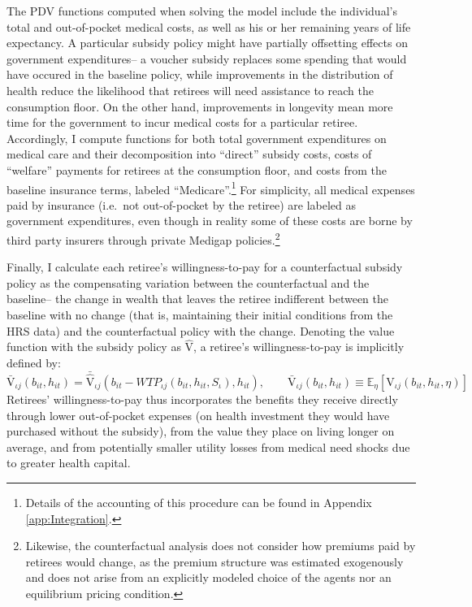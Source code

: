 \documentclass[12pt,pdftex,letterpaper]{article}
\newcommand{\E}{\mathbb{E}}
\newcommand{\Type}{\iota}
\newcommand{\Health}{h}
\newcommand{\Value}{\text{V}}
\newcommand{\Bank}{b}
\newcommand{\Subsidy}{S}
\newcommand{\Age}{j}
\newcommand{\MedShk}{\eta}
\begin{document}
The PDV functions computed when solving the model include the individual's total and out-of-pocket medical costs, as well as his or her remaining years of life expectancy.  A particular subsidy policy might have partially offsetting effects on government expenditures-- a voucher subsidy replaces some spending that would have occured in the baseline policy, while improvements in the distribution of health reduce the likelihood that retirees will need assistance to reach the consumption floor.  On the other hand, improvements in longevity mean more time for the government to incur medical costs for a particular retiree.  Accordingly, I compute functions for both total government expenditures on medical care and their decomposition into ``direct'' subsidy costs, costs of ``welfare'' payments for retirees at the consumption floor, and costs from the baseline insurance terms, labeled ``Medicare''.\footnote{Details of the accounting of this procedure can be found in Appendix \ref{app:Integration}.}  For simplicity, all medical expenses paid by insurance (i.e.\ not out-of-pocket by the retiree) are labeled as government expenditures, even though in reality some of these costs are borne by third party insurers through private Medigap policies.\footnote{Likewise, the counterfactual analysis does not consider how premiums paid by retirees would change, as the premium structure was estimated exogenously and does not arise from an explicitly modeled choice of the agents nor an equilibrium pricing condition.}

Finally, I calculate each retiree's willingness-to-pay for a counterfactual subsidy policy as the compensating variation between the counterfactual and the baseline-- the change in wealth that leaves the retiree indifferent between the baseline with no change (that is, maintaining their initial conditions from the HRS data) and the counterfactual policy with the change.  Denoting the value function with the subsidy policy as $\widehat{\Value}$, a retiree's willingness-to-pay is implicitly defined by:
\begin{equation}
\bar{\Value}_{\Type \Age}(\Bank_{it},\Health_{it}) = \bar{\widehat{\Value}}_{\Type \Age}(\Bank_{it} - WTP_{\Type \Age}(\Bank_{it},\Health_{it},\Subsidy_\Type), \Health_{it}), \qquad \bar{\Value}_{\Type \Age}(\Bank_{it},\Health_{it}) \equiv \E_\MedShk \left[ \Value_{\Type \Age}(\Bank_{it},\Health_{it},\MedShk) \right] 
\end{equation}
Retirees' willingness-to-pay thus incorporates the benefits they receive directly through lower out-of-pocket expenses (on health investment they would have purchased without the subsidy), from the value they place on living longer on average, and from potentially smaller utility losses from medical need shocks due to greater health capital.
\end{document}
